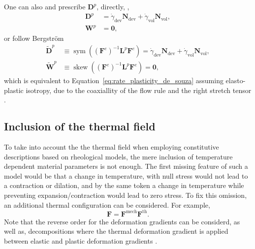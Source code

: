 One can also and prescribe $\mathbf D^p$, directly, \citep{boyceLargeInelasticDeformation1988},
\begin{align}
\label{eq:d_w_directly}
	\mathbf D^p & = \dot\gamma_\text{dev} \mathbf N_\text{dev} + \dot\gamma_\text{vol} \mathbf N_\text{vol},\\
	\mathbf W^p & = \bm 0,
\end{align}
or follow Bergström \citep{bergstromMechanicsSolidPolymers2015}
\begin{align}
	\label{eq:d_w_bergstrom}
	\tilde{\mathbf D}^p &\equiv \operatorname{sym}((\mathbf F^e)^{-1}\mathbf L^p \mathbf F^e) = \dot\gamma_\text{dev} \mathbf N_\text{dev} + \dot\gamma_\text{vol} \mathbf N_\text{vol},\\
	\tilde{\mathbf W}^p &\equiv \operatorname{skew}( (\mathbf F^e)^{-1}\mathbf L^p \mathbf F^e) = \bm 0,
\end{align}
which is equivalent to Equation~\eqref{eq:rate_plasticity_de_souza} assuming elasto-plastic isotropy, due to the coaxiallity of the flow rule and the right stretch tensor \citep{desouzanetoComputationalMethodsPlasticity2008}.

\subsection{Inclusion of the thermal field}
\label{sec:inclusion_thermal_field}

To take into account the the thermal field when employing constitutive descriptions based on rheological models, the mere inclusion of temperature dependent material parameters is not enough.
The first missing feature of such a model would be that a change in temperature, with null stress would not lead to a contraction or dilation, and by the same token a change in temperature while preventing expansion/contraction would lead to zero stress.
To fix this omission, an additional thermal configuration can be considered.
For example,
\begin{equation}
	\mathbf F = \mathbf F^\text{mech}\mathbf F^\text{th}.
\end{equation}
Note that the reverse order for the deformation gradients can be considerd, as well as, decompositions where the thermal deformation gradient is applied between elastic and plastic deformation gradients \citep{arrudaEffectsStrainRate1995}.

